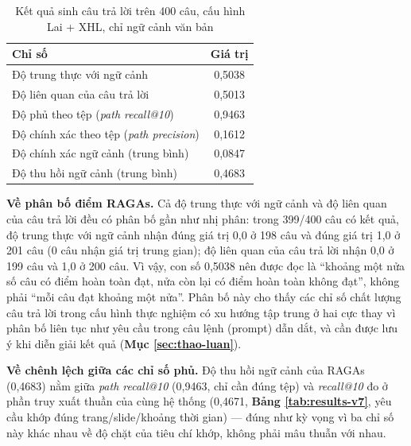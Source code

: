 \begin{table}[ht]
    \centering
    \caption{Kết quả sinh câu trả lời trên 400 câu, cấu hình Lai + XHL, chỉ ngữ cảnh văn bản}
    \label{tab:generation-v7}
    \begin{tabular}{|l|c|}
        \hline
        \textbf{Chỉ số}                                                  & \textbf{Giá trị} \\
        \hline
        Độ trung thực với ngữ cảnh                                  & 0,5038           \\
        \hline
        Độ liên quan của câu trả lời                                & 0,5013           \\
        \hline
        Độ phủ theo tệp (\textit{path recall@10})                        & 0,9463           \\
        \hline
        Độ chính xác theo tệp (\textit{path precision})                  & 0,1612           \\
        \hline
        Độ chính xác ngữ cảnh (trung bình)                               & 0,0847           \\
        \hline
        Độ thu hồi ngữ cảnh (trung bình)                                  & 0,4683           \\
        \hline
    \end{tabular}
\end{table}

\bigbreak\noindent
\textbf{Về phân bố điểm RAGAs.} Cả độ trung thực với ngữ cảnh và độ liên quan của câu trả lời đều có phân bố gần như nhị phân: trong 399/400 câu có kết quả, độ trung thực với ngữ cảnh nhận đúng giá trị 0,0 ở 198 câu và đúng giá trị 1,0 ở 201 câu (0 câu nhận giá trị trung gian); độ liên quan của câu trả lời nhận 0,0 ở 199 câu và 1,0 ở 200 câu. Vì vậy, con số 0,5038 nên được đọc là ``khoảng một nửa số câu có điểm hoàn toàn đạt, nửa còn lại có điểm hoàn toàn không đạt'', không phải ``mỗi câu đạt khoảng một nửa''. Phân bố này cho thấy các chỉ số chất lượng câu trả lời trong cấu hình thực nghiệm có xu hướng tập trung ở hai cực thay vì phân bố liên tục như yêu cầu trong câu lệnh (prompt) dẫn dắt, và cần được lưu ý khi diễn giải kết quả (\textbf{Mục \ref{sec:thao-luan}}).

\bigbreak\noindent
\textbf{Về chênh lệch giữa các chỉ số phủ.} Độ thu hồi ngữ cảnh của RAGAs (0,4683) nằm giữa \textit{path recall@10} (0,9463, chỉ cần đúng tệp) và \textit{recall@10} đo ở phần truy xuất thuần của cùng hệ thống (0,4671, \textbf{Bảng \ref{tab:results-v7}}, yêu cầu khớp đúng trang/slide/khoảng thời gian) — đúng như kỳ vọng vì ba chỉ số này khác nhau về độ chặt của tiêu chí khớp, không phải mâu thuẫn với nhau.

